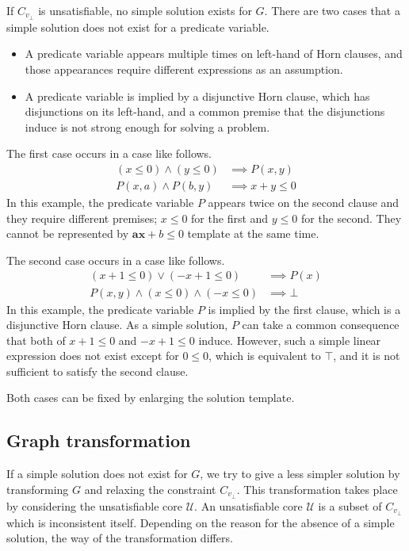 \documentclass[a4paper,12pt]{article}
\begin{document}
If $C_{v_\bot}$ is unsatisfiable, no simple solution exists for $G$.
There are two cases that a simple solution does not exist for a
predicate variable.
\begin{itemize}
\item A predicate variable appears multiple times on left-hand of Horn
  clauses, and those appearances require different expressions as an
  assumption.
\item A predicate variable is implied by a disjunctive Horn clause,
  which has disjunctions on its left-hand, and a common premise that
  the disjunctions induce is not strong enough for solving a problem.
\end{itemize}

The first case occurs in a case like follows.
\begin{align*}
\left( x \leq 0 \right) \wedge \left( y \leq 0 \right) & \implies P(x,y) \\
P(x,a) \wedge P(b,y) & \implies x+y \leq 0
\end{align*}
In this example, the predicate variable $P$ appears twice on the
second clause and they require different premises; $x \leq 0$ for the
first and $y \leq 0$ for the second.  They cannot be represented by
$\mathbf{ax} + b \leq 0$ template at the same time.

The second case occurs in a case like follows.
\begin{align*}
\left( x+1 \leq 0 \right) \vee \left( -x+1 \leq 0 \right) & \implies P(x) \\
P(x,y) \wedge \left( x \leq 0 \right) \wedge \left( -x \leq 0 \right) & \implies \bot
\end{align*}
In this example, the predicate variable $P$ is implied by the first
clause, which is a disjunctive Horn clause.  As a simple solution, $P$
can take a common consequence that both of $x+1 \leq 0$ and $-x+1 \leq
0$ induce.  However, such a simple linear expression does not exist
except for $0 \leq 0$, which is equivalent to $\top$, and it is not
sufficient to satisfy the second clause.

Both cases can be fixed by enlarging the solution template.


\subsection {Graph transformation}

If a simple solution does not exist for $G$, we try to give a less
simpler solution by transforming $G$ and relaxing the constraint
$C_{v_\bot}$.  This transformation takes place by considering the
unsatisfiable core $\mathcal{U}$.  An unsatisfiable core $\mathcal{U}$
is a subset of $C_{v_\bot}$ which is inconsistent itself.  Depending
on the reason for the absence of a simple solution, the way of the
transformation differs.
\end{document}
